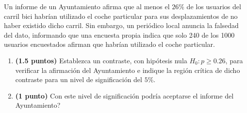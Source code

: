 
Un informe de un Ayuntamiento afirma que al menos el $26\%$ de los usuarios del carril bici habrían utilizado el coche particular para sus desplazamientos de no haber existido dicho carril. Sin embargo, un periódico local anuncia la falsedad del dato, informando que una encuesta propia indica que solo 240 de los 1000 usuarios encuestados afirman que habrían utilizado el coche particular.
\begin{enumerate}[label=\alph*)]
\item \textbf{(1.5 puntos)} Establezca un contraste, con hipótesis nula $H_0:p\geq0.26$, para verificar la afirmación del Ayuntamiento e indique la región crítica de dicho contraste para un nivel de significación del $5\%$.
\item \textbf{(1 punto)} Con este nivel de significación \textquestiondown{}podría aceptarse el informe del Ayuntamiento?
\end{enumerate}
